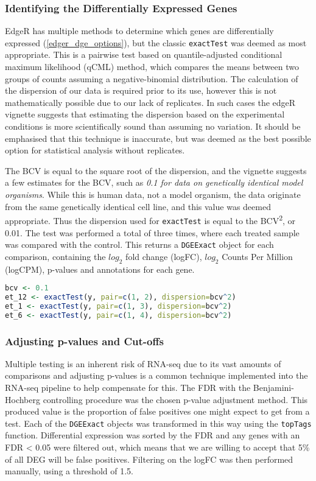 \subsubsection{Identifying the Differentially Expressed Genes}
EdgeR has multiple methods to determine which genes are differentially expressed (\autoref{edger_dge_options}), but the classic \texttt{exactTest} was deemed as most appropriate. This is a pairwise test based on quantile-adjusted conditional maximum likelihood (qCML) method, which compares the means between two groups of counts assuming a negative-binomial distribution. The calculation of the dispersion of our data is required prior to its use, however this is not mathematically possible due to our lack of replicates. In such cases the edgeR vignette suggests that estimating the dispersion based on the experimental conditions is more scientifically sound than assuming no variation. It should be emphasised that this technique is inaccurate, but was deemed as the best possible option for statistical analysis without replicates.

The \ac{BCV} is equal to the square root of the dispersion, and the vignette suggests a few estimates for the \ac{BCV}, such as \textit{0.1 for data on genetically identical model organisms}. While this is human data, not a model organism, the data originate from the same genetically identical cell line, and this value was deemed appropriate. Thus the dispersion used for \texttt{exactTest} is equal to the BCV\textsuperscript{2}, or 0.01. 
The test was performed a total of three times, where each treated sample was compared with the control. This returns a \texttt{DGEExact} object for each comparison, containing the $log_{2}$ fold change (logFC), $log_{2}$ Counts Per Million (logCPM), p-values and annotations for each gene. 

\begin{lstlisting}[language=R, caption=Exact test function]
bcv <- 0.1
et_12 <- exactTest(y, pair=c(1, 2), dispersion=bcv^2)
et_1 <- exactTest(y, pair=c(1, 3), dispersion=bcv^2)
et_6 <- exactTest(y, pair=c(1, 4), dispersion=bcv^2)
\end{lstlisting}

\subsubsection{Adjusting p-values and Cut-offs}

Multiple testing is an inherent risk of RNA-seq due to its vast amounts of comparisons and adjusting p-values is a common technique implemented into the RNA-seq pipeline to help compensate for this.  The \ac{FDR} with the Benjamini-Hochberg controlling procedure \citep{benjamini1995controlling} was the chosen p-value adjustment method. This produced value is the proportion of false positives one might expect to get from a test. Each of the \texttt{DGEExact} objects was transformed in this way using the \texttt{topTags} function. Differential expression was sorted by the \ac{FDR} and any genes with an \ac{FDR} < 0.05 were filtered out, which means that we are willing to accept that 5\% of all \ac{DEG} will be false positives. Filtering on the \ac{logFC} was then performed manually, using a threshold of 1.5.  

